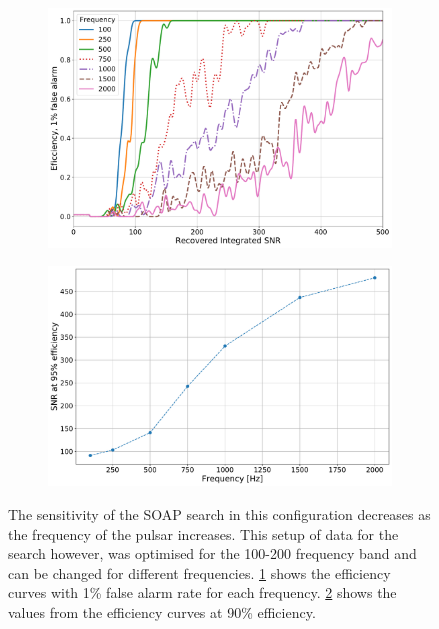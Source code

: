 \begin{figure}
	
	\begin{subfigure}[h]{0.9\linewidth}
			\centering
			\includegraphics[width=\linewidth]{C3_soap/snr_freq_eff.pdf}
			\caption{}
			\label{soap:sens:eff}
	\end{subfigure}

	\begin{subfigure}[h]{0.9\linewidth}
		\centering
		\includegraphics[width=\linewidth]{C3_soap/snr_with_freq.pdf}
		\caption{}
		\label{soap:sens:snrfreq}
	\end{subfigure}

\caption[How the sensitivity of SOAP changes with frequency.]{The sensitivity of the SOAP search in this configuration decreases as the frequency of the pulsar increases. This setup of data for the search however, was optimised for the 100-200 frequency band and can be changed for different frequencies. \ref{soap:sens:eff} shows the efficiency curves with 1\% false alarm rate for each frequency. \ref{soap:sens:snrfreq} shows the values from the efficiency curves at 90\% efficiency.}
\label{soap:sens:results}

\end{figure}


